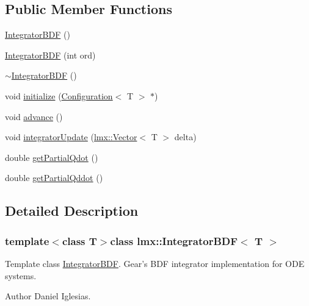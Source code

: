 \subsection*{Public Member Functions}
\begin{DoxyCompactItemize}
\item 
\hyperlink{classlmx_1_1IntegratorBDF_a44fd3d08ac8623287b4bea3019991154}{Integrator\-B\-D\-F} ()
\item 
\hyperlink{classlmx_1_1IntegratorBDF_a7c9463d51e5bc52fa01c4cc38774fecb}{Integrator\-B\-D\-F} (int ord)
\item 
\hyperlink{classlmx_1_1IntegratorBDF_ab84c9f712d342b834694e2667cf06b1d}{$\sim$\-Integrator\-B\-D\-F} ()
\item 
void \hyperlink{classlmx_1_1IntegratorBDF_a5ce2c4b88ec3dd23dce5b61122edfbe2}{initialize} (\hyperlink{classlmx_1_1Configuration}{Configuration}$<$ T $>$ $\ast$)
\item 
void \hyperlink{classlmx_1_1IntegratorBDF_a2b64844c160725add2f97ae58cb8b923}{advance} ()
\item 
void \hyperlink{classlmx_1_1IntegratorBDF_a117816d08be3d2161b5ecaa9ae4294a3}{integrator\-Update} (\hyperlink{classlmx_1_1Vector}{lmx\-::\-Vector}$<$ T $>$ delta)
\item 
double \hyperlink{classlmx_1_1IntegratorBDF_af4fc49737d760c485b74dda1308a18dc}{get\-Partial\-Qdot} ()
\item 
double \hyperlink{classlmx_1_1IntegratorBDF_a2277553d925ce0d7e0fabd855dcb629e}{get\-Partial\-Qddot} ()
\end{DoxyCompactItemize}


\subsection{Detailed Description}
\subsubsection*{template$<$class T$>$class lmx\-::\-Integrator\-B\-D\-F$<$ T $>$}

Template class \hyperlink{classlmx_1_1IntegratorBDF}{Integrator\-B\-D\-F}. Gear's B\-D\-F integrator implementation for O\-D\-E systems. 

\begin{DoxyAuthor}{Author}
Daniel Iglesias. 
\end{DoxyAuthor}


